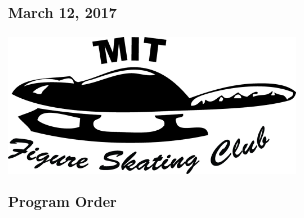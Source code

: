 \documentclass[12pt]{article}
\newcommand{\programnumber}[2]{{
  \vspace{0.1in}
  \textbf{#1}\\
  {\footnotesize #2}
}}
\begin{document}
\begin{multicols*}{2}
\begin{center}
\vspace{0.2in}

{\large \textbf{March 12, 2017}}

\vspace{0.7in}

\includegraphics[width=3in]{fsclogo.png}

\end{center}

\vfill\null
\columnbreak


\begin{center}

{\large \textbf{Program Order}}



\end{center}
\end{multicols*}
\end{document}
